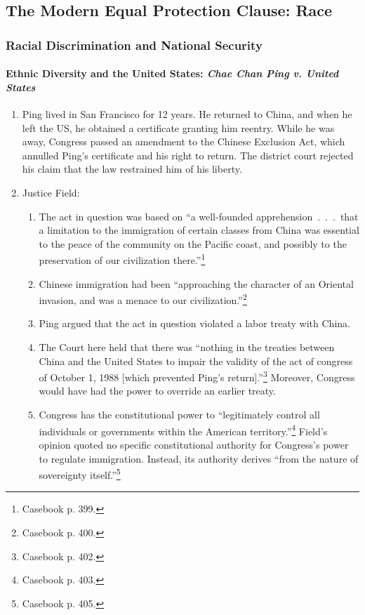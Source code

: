 \subsection{The Modern Equal Protection Clause: Race}

\subsubsection{Racial Discrimination and National Security}

\paragraph{Ethnic Diversity and the United States: \emph{Chae Chan Ping v. 
United States}}

\begin{enumerate}
    \item Ping lived in San Francisco for 12 years. He returned to China, and 
    when he left the US, he obtained a certificate granting him reentry. While 
    he was away, Congress passed an amendment to the Chinese Exclusion Act, 
    which annulled Ping's certificate and his right to return. The district 
    court rejected his claim that the law restrained him of his liberty.
    \item Justice Field:
    \begin{enumerate}
        \item The act in question was based on ``a well-founded 
        apprehension~.~.~.~that a limitation to the immigration of certain 
        classes from China was essential to the peace of the community on the 
        Pacific coast, and possibly to the preservation of our civilization 
        there.''\footnote{Casebook p. 399.}
        \item Chinese immigration had been ``approaching the character of an 
        Oriental invasion, and was a menace to our 
        civilization.''\footnote{Casebook p. 400.}
        \item Ping argued that the act in question violated a labor treaty 
        with China.
        \item The Court here held that there was ``nothing in the treaties 
        between China and the United States to impair the validity of the act 
        of congress of October 1, 1988 [which prevented Ping's 
        return].''\footnote{Casebook p. 402.} Moreover, Congress would have 
        had the power to override an earlier treaty.
        \item Congress has the constitutional power to ``legitimately control 
        all individuals or governments within the American 
        territory.''\footnote{Casebook p.  403.} Field's opinion 
        quoted no specific constitutional authority for Congress's power to 
        regulate immigration. Instead, its authority derives ``from the nature 
        of sovereignty itself.''\footnote{Casebook p. 405.}
    \end{enumerate}
\end{enumerate}


